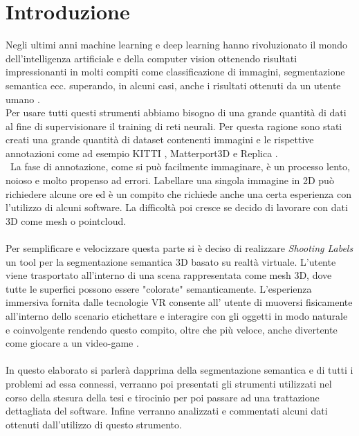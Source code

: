 \chapter*{Introduzione}
{}

Negli ultimi anni machine learning e deep learning hanno rivoluzionato il mondo dell'intelligenza artificiale e della computer vision ottenendo risultati impressionanti in molti compiti come classificazione di immagini, segmentazione semantica ecc. superando, in alcuni casi, anche i risultati ottenuti da un utente umano \cite{imagenet}.\\
Per usare tutti questi strumenti abbiamo bisogno di una grande quantità di dati al fine di supervisionare il training di reti neurali. Per questa ragione sono stati creati una grande quantità di dataset contenenti immagini e le rispettive annotazioni come ad esempio KITTI \cite{KITTI}, Matterport3D \cite{Matter} e Replica \cite{Replica}.\\\
La fase di annotazione, come si può facilmente immaginare, è un processo lento, noioso e molto propenso ad errori. Labellare una singola immagine in 2D può richiedere alcune ore ed è un compito che richiede anche una certa esperienza con l'utilizzo di alcuni software. La difficoltà poi cresce se decido di lavorare con dati 3D come mesh o pointcloud.\\\\
Per semplificare e velocizzare questa parte si è deciso di realizzare \textit{Shooting Labels} un tool per la segmentazione semantica 3D basato su realtà virtuale. L'utente viene trasportato all'interno di una scena rappresentata come mesh 3D, dove tutte le superfici possono essere "colorate" semanticamente. L'esperienza immersiva fornita dalle tecnologie VR consente all' utente di muoversi fisicamente all'interno dello scenario etichettare e interagire con gli oggetti in modo naturale e coinvolgente rendendo questo compito, oltre che più veloce, anche divertente come giocare a un video-game \cite{SL}.\\\\
In questo elaborato si parlerà dapprima della segmentazione semantica e di tutti i problemi ad essa connessi, verranno poi presentati gli strumenti utilizzati nel corso della stesura della tesi e tirocinio per poi passare ad una trattazione dettagliata del software. Infine verranno analizzati e commentati alcuni dati ottenuti dall'utilizzo di questo strumento.